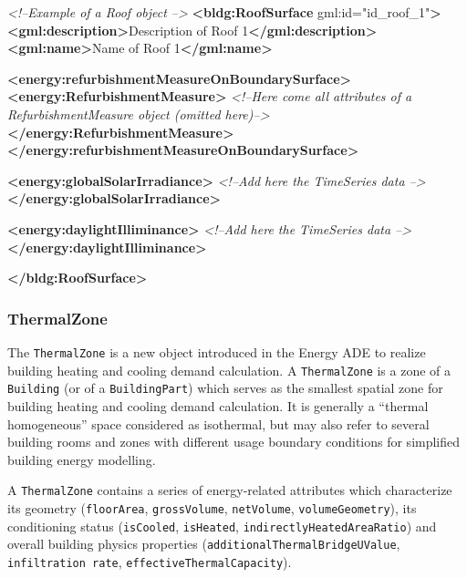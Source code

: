 \documentclass[a4paper,12pt]{article}
\newenvironment{Shaded}{}{}
\newcommand{\KeywordTok}[1]{\textcolor[rgb]{0.00,0.44,0.13}{\textbf{{#1}}}}
\newcommand{\StringTok}[1]{\textcolor[rgb]{0.25,0.44,0.63}{{#1}}}
\newcommand{\CommentTok}[1]{\textcolor[rgb]{0.38,0.63,0.69}{\textit{{#1}}}}
\newcommand{\OtherTok}[1]{\textcolor[rgb]{0.00,0.44,0.13}{{#1}}}
\newcommand{\NormalTok}[1]{{#1}}
\begin{document}
\begin{Shaded}
\begin{Highlighting}[]
\CommentTok{<!--Example of a Roof object -->}
\KeywordTok{<bldg:RoofSurface}\OtherTok{ gml:id=}\StringTok{"id_roof_1"}\KeywordTok{>}
    \KeywordTok{<gml:description>}\NormalTok{Description of Roof 1}\KeywordTok{</gml:description>}
    \KeywordTok{<gml:name>}\NormalTok{Name of Roof 1}\KeywordTok{</gml:name>}

    \KeywordTok{<energy:refurbishmentMeasureOnBoundarySurface>}
        \KeywordTok{<energy:RefurbishmentMeasure>}
            \CommentTok{<!--Here come all attributes of a RefurbishmentMeasure object (omitted here)-->}
        \KeywordTok{</energy:RefurbishmentMeasure>}
    \KeywordTok{</energy:refurbishmentMeasureOnBoundarySurface>}

    \KeywordTok{<energy:globalSolarIrradiance>}
        \CommentTok{<!--Add here the TimeSeries data -->}
    \KeywordTok{</energy:globalSolarIrradiance>}

    \KeywordTok{<energy:daylightIlliminance>}
        \CommentTok{<!--Add here the TimeSeries data -->}
    \KeywordTok{</energy:daylightIlliminance>}

\KeywordTok{</bldg:RoofSurface>}
\end{Highlighting}
\end{Shaded}

\subsubsection{ThermalZone}\label{thermalzone}

The \texttt{ThermalZone} is a new object introduced in the Energy ADE to
realize building heating and cooling demand calculation. A
\texttt{ThermalZone} is a zone of a \texttt{Building} (or of a
\texttt{BuildingPart}) which serves as the smallest spatial zone for
building heating and cooling demand calculation. It is generally a
``thermal homogeneous'' space considered as isothermal, but may also
refer to several building rooms and zones with different usage boundary
conditions for simplified building energy modelling.

A \texttt{ThermalZone} contains a series of energy-related attributes
which characterize its geometry (\texttt{floorArea},
\texttt{grossVolume}, \texttt{netVolume}, \texttt{volumeGeometry}), its
conditioning status (\texttt{isCooled}, \texttt{isHeated},
\texttt{indirectlyHeatedAreaRatio}) and overall building physics
properties (\texttt{additionalThermalBridgeUValue},
\texttt{infiltration\ rate}, \texttt{effectiveThermalCapacity}).
\end{document}
